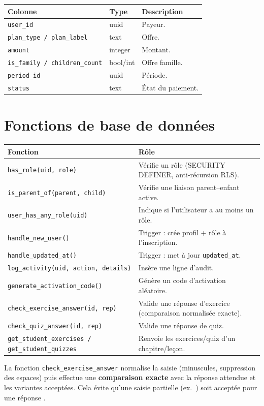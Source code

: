 \begin{longtable}{p{3.6cm}p{2.6cm}p{8cm}}
\toprule \textbf{Colonne} & \textbf{Type} & \textbf{Description} \\ \midrule \endhead
\texttt{user\_id} & uuid & Payeur. \\
\texttt{plan\_type / plan\_label} & text & Offre. \\
\texttt{amount} & integer & Montant. \\
\texttt{is\_family / children\_count} & bool/int & Offre famille. \\
\texttt{period\_id} & uuid & Période. \\
\texttt{status} & text & État du paiement. \\
\bottomrule
\end{longtable}

\section{Fonctions de base de données}
\begin{longtable}{p{4.8cm}p{9.6cm}}
\toprule \textbf{Fonction} & \textbf{Rôle} \\ \midrule \endhead
\texttt{has\_role(uid, role)} & Vérifie un rôle (SECURITY DEFINER, anti-récursion RLS). \\
\texttt{is\_parent\_of(parent, child)} & Vérifie une liaison parent--enfant active. \\
\texttt{user\_has\_any\_role(uid)} & Indique si l'utilisateur a au moins un rôle. \\
\texttt{handle\_new\_user()} & Trigger : crée profil + rôle à l'inscription. \\
\texttt{handle\_updated\_at()} & Trigger : met à jour \texttt{updated\_at}. \\
\texttt{log\_activity(uid, action, details)} & Insère une ligne d'audit. \\
\texttt{generate\_activation\_code()} & Génère un code d'activation aléatoire. \\
\texttt{check\_exercise\_answer(id, rep)} & Valide une réponse d'exercice (comparaison normalisée exacte). \\
\texttt{check\_quiz\_answer(id, rep)} & Valide une réponse de quiz. \\
\texttt{get\_student\_exercises / get\_student\_quizzes} & Renvoie les exercices/quiz d'un chapitre/leçon. \\
\bottomrule
\end{longtable}

\begin{infobox}
La fonction \texttt{check\_exercise\_answer} normalise la saisie (minuscules,
suppression des espaces) puis effectue une \textbf{comparaison exacte} avec la
réponse attendue et les variantes acceptées. Cela évite qu'une saisie partielle
(ex.\ \fg{}) soit acceptée pour une réponse \fg{}.
\end{infobox}

